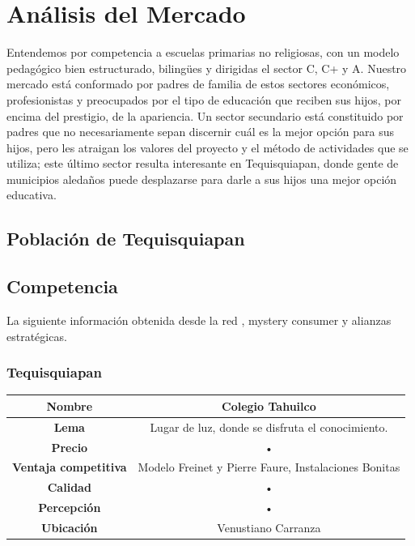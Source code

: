 \documentclass[10pt,letterpaper,oneside]{book}
\begin{document}
\section{Análisis del Mercado}

Entendemos por competencia a escuelas primarias no religiosas, con un modelo pedagógico bien estructurado, bilingües y dirigidas el sector C, C+ y A. Nuestro mercado está conformado por padres de familia de estos sectores económicos, profesionistas y preocupados por el tipo de educación que reciben sus hijos, por encima del prestigio, de la apariencia. Un sector secundario está constituido por padres que no necesariamente sepan discernir cuál es la mejor opción para sus hijos, pero les atraigan los valores del proyecto y el método de actividades que se utiliza; este último sector resulta interesante en Tequisquiapan, donde gente de municipios aledaños puede desplazarse para darle a sus hijos una mejor opción educativa.

\subsection{Población de Tequisquiapan}





\subsection{Competencia}

La siguiente información obtenida desde la red \cite{mejoresescuelas}, mystery consumer y alianzas estratégicas.

\subsubsection*{Tequisquiapan}
\begin{center}
\begin{tabular}{|c|c|}
\hline 
{\bf Nombre} & Colegio Tahuilco \\ 
\hline 
{\bf Lema} & Lugar de luz, donde se disfruta el conocimiento. \\ 
\hline 
{\bf Precio} & • \\ 
\hline 
{\bf Ventaja competitiva} & Modelo Freinet y Pierre Faure, Instalaciones Bonitas \\ 
\hline 
{\bf Calidad} & • \\ 
\hline
{\bf Percepción} & • \\ 
\hline 
{\bf Ubicación} & Venustiano Carranza \\ 
\hline 
\end{tabular} 
\end{center}
\end{document}

